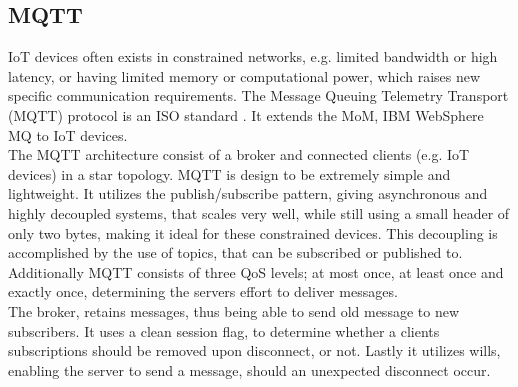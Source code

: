 \subsection{MQTT}
IoT devices often exists in constrained networks, e.g. limited bandwidth or high latency, or having limited memory or computational power, which raises new specific communication requirements. The Message Queuing Telemetry Transport (MQTT) protocol is an ISO standard \cite{developing_standards_2016}. It extends the MoM, IBM WebSphere MQ to IoT devices.\\

The MQTT architecture consist of a broker and connected clients (e.g. IoT devices) in a star topology. MQTT is design to be extremely simple and lightweight. It utilizes the publish/subscribe pattern, giving asynchronous and highly decoupled systems, that scales very well, while still using a small header of only two bytes, making it ideal for these constrained devices. This decoupling is accomplished by the use of topics, that can be subscribed or published to. Additionally MQTT consists of three QoS levels; at most once, at least once and exactly once, determining the servers effort to deliver messages.\\

The broker, retains messages, thus being able to send old message to new subscribers. It uses a clean session flag, to determine whether a clients subscriptions should be removed upon disconnect, or not. Lastly it utilizes wills, enabling the server to send a message, should an unexpected disconnect occur.

